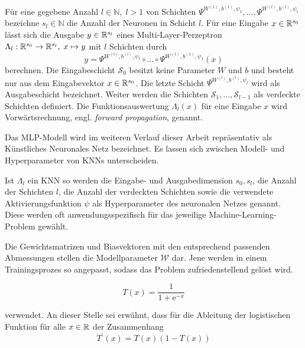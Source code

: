 \begin{defi}
    Für eine gegebene Anzahl $l \in \mathbb{N}, \; l>1$ von Schichten $\Psi^{W^{(1)},b^{(1)},\psi_{1}}, \ldots, \Psi^{W^{(l)},b^{(l)},\psi_{l}}$ bezeichne $s_l \in \mathbb{N}$ die Anzahl der Neuronen in Schicht $l$. Für eine Eingabe $x \in \mathbb{R}^{s_0}$ lässt sich die Ausgabe $y \in \mathbb{R}^{s_l}$ eines Multi-Layer-Perzeptron  $\Lambda_l: \mathbb{R}^{s_0} \rightarrow \mathbb{R}^{s_l}, \; x \mapsto y$ mit $l$ Schichten durch
    \[
        y=\Psi^{W^{(l)},b^{(l)},\psi_{l}} \circ \ldots \circ \Psi^{W^{(1)},b^{(1)},\psi_{1}}(x)
    \]
    berechnen. Die Eingabeschicht $\mathcal{S}_0$ besitzt keine Parameter $W$ und $b$ und besteht nur aus dem Eingabevektor $x \in \mathbb{R}^{s_0}$. Die letzte Schicht $\Psi^{W^{(l)},b^{(l)},\psi_{l}}$ wird als Ausgabeschicht bezeichnet. Weiter werden die Schichten $\mathcal{S}_1, \ldots, \mathcal{S}_{l-1}$ als verdeckte Schichten definiert. Die Funktionsauswertung $\Lambda_l(x)$ für eine Eingabe $x$ wird Vorwärtsrechnung, engl. \textit{forward propagation}, genannt.
\end{defi}
Das MLP-Modell wird im weiteren Verlauf dieser Arbeit repräsentativ als Künstliches Neuronales Netz bezeichnet. 
Es lassen sich zwischen Modell- und Hyperparameter von KNNs unterscheiden.

\begin{bem}
    Ist $\Lambda_l$ ein KNN so werden die Eingabe- und Ausgabedimension $s_0, s_l$, die Anzahl der Schichten $l$, die Anzahl der verdeckten Schichten sowie die verwendete Aktivierungsfunktion $\psi$ als Hyperparameter des neuronalen Netzes genannt. Diese werden oft anwendungsspezifisch für das jeweilige Machine-Learning-Problem gewählt. 
    
    Die Gewichtsmatrizen und Biasvektoren mit den entsprechend passenden Abmessungen stellen die Modellparameter $\mathcal{W}$ dar. Jene werden in einem Trainingsprozes so angepasst, sodass das Problem zufriedenstellend gelöst wird.
\end{bem}

\begin{equation*}
    \label{logf}
    T(x)=\frac{1}{1+\mathrm{e}^{-x}}
\end{equation*}

verwendet. An dieser Stelle sei erwähnt, dass für die Ableitung der logistischen Funktion für alle $x \in \mathbb{R}$ der Zusammenhang
\begin{equation*}
    \label{difflogf}
    T^{\prime} (x)=T(x)(1-T(x)) 
\end{equation*}

